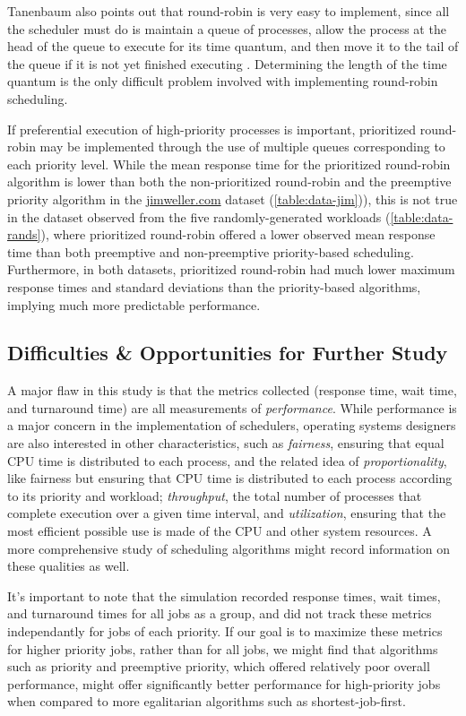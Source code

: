 \documentclass[12pt,letterpaper]{article}
\begin{document}
  			Tanenbaum also points out that round-robin is very easy to implement, since all the scheduler must do is maintain a queue of processes, allow the process at the head of the queue to execute for its time quantum, and then move it to the tail of the queue if it is not yet finished executing \cite{tanenbaum2007modern}. Determining the length of the time quantum is the only difficult problem involved with implementing round-robin scheduling. 

  			If preferential execution of high-priority processes is important, prioritized round-robin may be implemented through the use of multiple queues corresponding to each priority level. While the mean response time for the prioritized round-robin algorithm is lower than both the non-prioritized round-robin and the preemptive priority algorithm in the \url{jimweller.com} dataset (\cref{table:data-jim})), this is not true in the dataset observed from the five randomly-generated workloads (\cref{table:data-rands}), where prioritized round-robin offered a lower observed mean response time than both preemptive and non-preemptive priority-based scheduling. Furthermore, in both datasets, prioritized round-robin had much lower maximum response times and standard deviations than the priority-based algorithms, implying much more predictable performance. 

  		\subsection{Difficulties \& Opportunities for Further Study}

  			A major flaw in this study is that the metrics collected (response time, wait time, and turnaround time) are all measurements of \textit{performance}. While performance is a major concern in the implementation of schedulers, operating systems designers are also interested in other characteristics, such as \textit{fairness}, ensuring that equal CPU time is distributed to each process, and the related idea of \textit{proportionality}, like fairness but ensuring that CPU time is distributed to each process according to its priority and workload; \textit{throughput}, the total number of processes that complete execution over a given time interval, and \textit{utilization}, ensuring that the most efficient possible use is made of the CPU and other system resources. A more comprehensive study of scheduling algorithms might record information on these qualities as well.

  			It's important to note that the simulation recorded response times, wait times, and turnaround times for all jobs as a group, and did not track these metrics independantly for jobs of each priority. If our goal is to maximize these metrics for higher priority jobs, rather than for all jobs, we might find that algorithms such as priority and preemptive priority, which offered relatively poor overall performance, might offer significantly better performance for high-priority jobs when compared to more egalitarian algorithms such as shortest-job-first.
\end{document}
